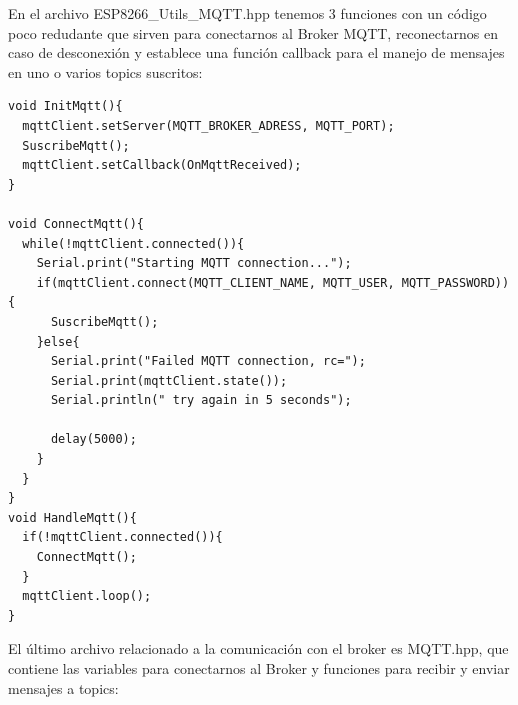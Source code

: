 \documentclass[oneside]{article}
\begin{document}
En el archivo {\color{blue}ESP8266\_Utils\_MQTT.hpp} tenemos 3 funciones con un código poco redudante que sirven para conectarnos al Broker MQTT, reconectarnos en caso de desconexión y establece una función callback para el manejo de mensajes en uno o varios topics suscritos:

\begin{lstlisting}[frame=single]
void InitMqtt(){
  mqttClient.setServer(MQTT_BROKER_ADRESS, MQTT_PORT);
  SuscribeMqtt();
  mqttClient.setCallback(OnMqttReceived);
}

void ConnectMqtt(){
  while(!mqttClient.connected()){
    Serial.print("Starting MQTT connection...");
    if(mqttClient.connect(MQTT_CLIENT_NAME, MQTT_USER, MQTT_PASSWORD)){
      SuscribeMqtt();
    }else{
      Serial.print("Failed MQTT connection, rc=");
      Serial.print(mqttClient.state());
      Serial.println(" try again in 5 seconds");

      delay(5000);
    }
  }
}
void HandleMqtt(){
  if(!mqttClient.connected()){
    ConnectMqtt();
  }
  mqttClient.loop();
}
\end{lstlisting}

El último archivo relacionado a la comunicación con el broker es {\color{blue}MQTT.hpp}, que contiene las variables para conectarnos al Broker y funciones para recibir y enviar mensajes a topics:
\end{document}
